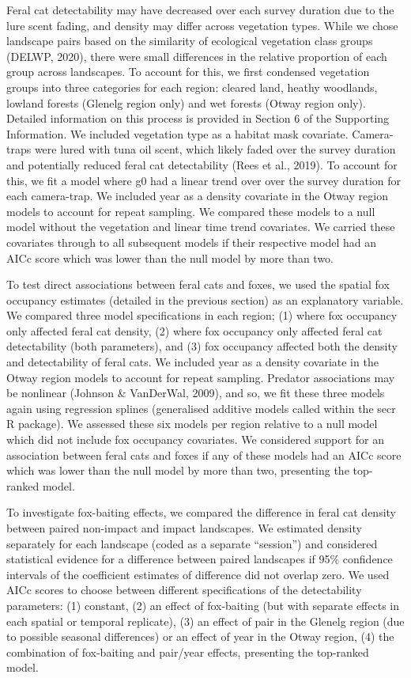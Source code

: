 \documentclass[]{elsarticle} %
\begin{document}
Feral cat detectability may have decreased over each survey duration due to the lure scent fading, and density may differ across vegetation types. While we chose landscape pairs based on the similarity of ecological vegetation class groups (DELWP, 2020), there were small differences in the relative proportion of each group across landscapes. To account for this, we first condensed vegetation groups into three categories for each region: cleared land, heathy woodlands, lowland forests (Glenelg region only) and wet forests (Otway region only). Detailed information on this process is provided in Section 6 of the Supporting Information. We included vegetation type as a habitat mask covariate. Camera-traps were lured with tuna oil scent, which likely faded over the survey duration and potentially reduced feral cat detectability (Rees et al., 2019). To account for this, we fit a model where g0 had a linear trend over over the survey duration for each camera-trap. We included year as a density covariate in the Otway region models to account for repeat sampling. We compared these models to a null model without the vegetation and linear time trend covariates. We carried these covariates through to all subsequent models if their respective model had an AICc score which was lower than the null model by more than two.

To test direct associations between feral cats and foxes, we used the spatial fox occupancy estimates (detailed in the previous section) as an explanatory variable. We compared three model specifications in each region; (1) where fox occupancy only affected feral cat density, (2) where fox occupancy only affected feral cat detectability (both parameters), and (3) fox occupancy affected both the density and detectability of feral cats. We included year as a density covariate in the Otway region models to account for repeat sampling. Predator associations may be nonlinear (Johnson \& VanDerWal, 2009), and so, we fit these three models again using regression splines (generalised additive models called within the secr R package). We assessed these six models per region relative to a null model which did not include fox occupancy covariates. We considered support for an association between feral cats and foxes if any of these models had an AICc score which was lower than the null model by more than two, presenting the top-ranked model.

To investigate fox-baiting effects, we compared the difference in feral cat density between paired non-impact and impact landscapes. We estimated density separately for each landscape (coded as a separate ``session'') and considered statistical evidence for a difference between paired landscapes if 95\% confidence intervals of the coefficient estimates of difference did not overlap zero. We used AICc scores to choose between different specifications of the detectability parameters: (1) constant, (2) an effect of fox-baiting (but with separate effects in each spatial or temporal replicate), (3) an effect of pair in the Glenelg region (due to possible seasonal differences) or an effect of year in the Otway region, (4) the combination of fox-baiting and pair/year effects, presenting the top-ranked model.
\end{document}
